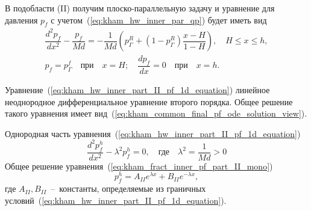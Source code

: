 \documentclass{article}
\newcommand{\mysub}[1]{%
  \par\vspace{0.5em}\noindent{\normalsize\underline{#1}}\par\vspace{0.5em}%
}
\begin{document}
\mysub{Подобласть (II) $H \leq x \leq h$}
В подобласти (II) получим плоско-параллельную задачу и уравнение для давления $p_f$ с 
учетом~(\ref{eq:kham_hw_inner_par_qp}) будет иметь вид
\begin{equation}
	\displaystyle
	\begin{gathered}
		\dfrac{d^2 p_f}{dx^2}-\dfrac{p_f}{Md}=-\dfrac{1}{Md}\left(p^R_{\Gamma} + (1 - p^R_{\Gamma})\dfrac{x - H}{1-H}\right), 
		\quad H \leq x \leq h, \\
		p_f = p^f_{\Gamma}  \quad \text{при} \quad x = H; \quad \dfrac{d p_f}{d x} = 0 \quad \text{при} \quad x = h.
	\end{gathered}
	\label{eq:kham_hw_inner_part_II_pf_1d_equation}
\end{equation}

Уравнение~(\ref{eq:kham_hw_inner_part_II_pf_1d_equation}) линейное неоднородное дифференциальное уравнение второго порядка.
Общее решение такого уравнения имеет вид~(\ref{eq:kham_common_final_pf_ode_solution_view}).

Однородная часть уравнения~(\ref{eq:kham_hw_inner_part_II_pf_1d_equation})
\begin{equation}
	\displaystyle
	\dfrac{d^2 p_f^h}{dx^2}-\lambda^2 p_f^h = 0, \quad \text{где} \quad \lambda^2 = \dfrac{1}{Md} > 0
	\label{eq:kham_fract_inner_pf_part_II_mono}
\end{equation}
Общее решение уравнения~(\ref{eq:kham_fract_inner_pf_part_II_mono})
\begin{equation}
	\displaystyle
	p_f^h = A_{II} e^{\lambda x} + B_{II} e^{-\lambda x},
	\label{eq:kham_fract_inner_pf_part_II_mono_solution}
\end{equation}
где $A_{II}, B_{II}$~--~константы, определяемые из граничных условий~(\ref{eq:kham_hw_inner_part_II_pf_1d_equation}).
\end{document}
